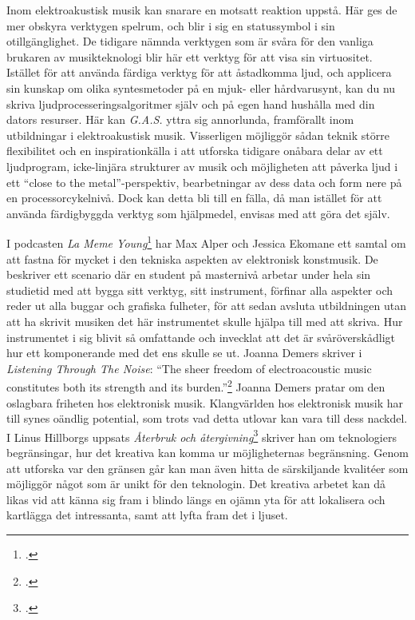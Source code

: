 \documentclass{article}
\begin{document}
Inom elektroakustisk musik kan snarare en motsatt reaktion uppstå. Här ges de mer obskyra verktygen spelrum,
och blir i sig en statussymbol i sin otillgänglighet. De tidigare nämnda verktygen som är svåra för den
vanliga brukaren av musikteknologi blir här ett verktyg för att visa sin virtuositet. Istället för att använda
färdiga verktyg för att åstadkomma ljud, och applicera sin kunskap om olika syntesmetoder på en mjuk- eller
hårdvarusynt, kan du nu skriva ljudprocesseringsalgoritmer själv och på egen hand hushålla med din dators
resurser. Här kan \emph{G.A.S.} yttra sig annorlunda, framförallt inom utbildningar i elektroakustisk
musik. Visserligen möjliggör sådan teknik större flexibilitet och en inspirationkälla i att utforska tidigare
onåbara delar av ett ljudprogram, icke-linjära strukturer av musik och möjligheten att påverka ljud i ett
``close to the metal''-perspektiv, bearbetningar av dess data och form nere på en processorcykelnivå. Dock kan
detta bli till en fälla, då man istället för att använda färdigbyggda verktyg som hjälpmedel, envisas med att
göra det själv.

I podcasten \emph{La Meme Young}\footcite{LaMemeYoung} har Max Alper och Jessica Ekomane ett samtal
om att fastna för mycket i den tekniska aspekten av elektronisk konstmusik. De beskriver ett scenario där en
student på masternivå arbetar under hela sin studietid med att bygga sitt verktyg, sitt instrument, förfinar
alla aspekter och reder ut alla buggar och grafiska fulheter, för att sedan avsluta utbildningen utan att ha
skrivit musiken det här instrumentet skulle hjälpa till med att skriva. Hur instrumentet i sig blivit så
omfattande och invecklat att det är svåröverskådligt hur ett komponerande med det ens skulle se ut. Joanna Demers
skriver i \emph{Listening Through The Noise}: ``The sheer freedom of electroacoustic music constitutes both
its strength and its burden.''\footcite{JoannaDemers} Joanna Demers pratar om den oslagbara friheten hos
elektronisk musik. Klangvärlden hos elektronisk musik har till synes oändlig potential, som trots vad detta
utlovar kan vara till dess nackdel. I Linus Hillborgs uppsats \emph{Återbruk och
återgivning}\footcite{LinusHillborg} skriver han om teknologiers begränsingar, hur det kreativa kan komma ur
möjligheternas begränsning. Genom att utforska var den gränsen går kan man även hitta de särskiljande
kvalitéer som möjliggör något som är unikt för den teknologin. Det kreativa arbetet kan då likas vid att känna
sig fram i blindo längs en ojämn yta för att lokalisera och kartlägga det intressanta, samt att lyfta fram det
i ljuset.
\end{document}
